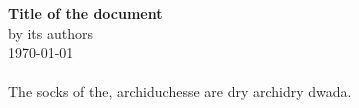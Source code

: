 \documentclass[a4paper,10pt,openany,oneside]{report}
\begin{document}

\thispagestyle{empty}
\vspace*{3cm}
\begin{center}
\textbf{\Huge{Title of the document}} \\[1cm]
{\Large by its authors} \\[5cm]
\today
\end{center}

\tableofcontents
\pagebreak
\setcounter{page}{0}

\paragraph{}
The socks of the, archiduchesse are dry archidry
dwada.
\paragraph{}
\end{document}
